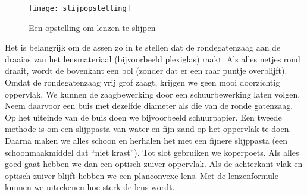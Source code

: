 \begin{figure}[H]
\noindent \begin{centering}
\texttt{[image: slijpopstelling]}
\par\end{centering}

\caption{Een opstelling om lenzen te slijpen}
\end{figure}


Het is belangrijk om de assen zo in te stellen dat de rondegatenzaag
aan de draaias van het lensmateriaal (bijvoorbeeld plexiglas) raakt.
Als alles netjes rond draait, wordt de bovenkant een bol (zonder dat
er een raar puntje overblijft). Omdat de rondegatenzaag vrij grof
zaagt, krijgen we geen mooi doorzichtig oppervlak. We kunnen de zaagbewerking
door een schuurbewerking laten volgen. Neem daarvoor een buis met
dezelfde diameter als die van de ronde gatenzaag. Op het uiteinde
van de buis doen we bijvoorbeeld schuurpapier. Een tweede methode
is om een slijppasta van water en fijn zand op het oppervlak te doen.
Daarna maken we alles schoon en herhalen het met een fijnere slijppasta
(een schoonmaakmiddel dat ``niet krast''). Tot slot gebruiken we
koperpoets. Als alles goed gaat hebben we dan een optisch zuiver oppervlak.
Als de achterkant vlak en optisch zuiver blijft hebben we een planconvexe
lens. Met de lenzenformule kunnen we uitrekenen hoe sterk de lens
wordt.


